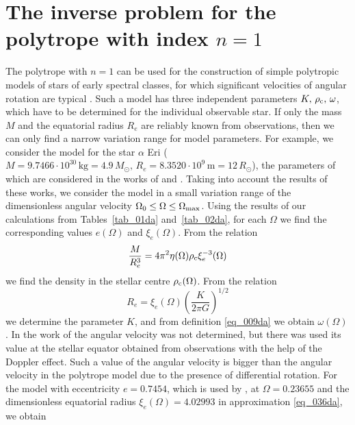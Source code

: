\documentclass{caosp308}
\begin{document}

\section{The inverse problem for the polytrope with index $n=1$}
\label{sect_07da}

The polytrope with $n=1$ can be used for the construction of simple polytropic models of stars of early spectral classes, for which significant velocities of angular rotation are typical \citep{2015MNRAS.448..456K}. Such a model has three independent parameters $K,\,\rho_{\rm c},\,\omega$, which have to be determined for the individual observable star. If only the mass $M$ and the equatorial radius $R_e$ are reliably known from observations, then we can only find a narrow variation range for model parameters. For example, we consider the model for the star $\alpha$ Eri ($M=9.7466\cdot10^{30}\,\text{kg}=4.9\,M_\odot,\,R_e=8.3520\cdot10^9\,\text{m}=12\,R_\odot$), the parameters of which are considered in the works of \citet{2015MNRAS.448..456K} and \citet{2017MNRAS.467.4965K}. Taking into account the results of these works, we consider the model in a small variation range of the dimensionless angular velocity $\Omega_0\leq\Omega\leq\Omega_{\rm max}$. Using the results of our calculations from Tables~\ref{tab_01da} and~\ref{tab_02da}, for each $\Omega$ we find the corresponding values $e(\Omega)$ and $\xi_e(\Omega)$. From the relation
\begin{equation}
\label{eq_058da}
\frac{M}{R_e^3}=4\pi^2\eta(\Omega)\rho_{\rm c}\xi_e^{-3}(\Omega)
\end{equation}
we find the density in the stellar centre $\rho_{\rm c}(\Omega)$. From the relation
\begin{equation}
\label{eq_059da}
R_e=\xi_e(\Omega)\left(\frac{K}{2\pi G}\right)^{1/2}
\end{equation}
we determine the parameter $K$, and from definition \eqref{eq_009da} we obtain $\omega(\Omega)$. In the work of \citet{2015MNRAS.448..456K} the angular velocity was not determined, but there was used its value at the stellar equator obtained from observations with the help of the Doppler effect. Such a value of the angular velocity is bigger than the angular velocity in the polytrope model due to the presence of differential rotation.    
For the model with eccentricity $e=0.7454$, which is used by \citet{2015MNRAS.448..456K}, at $\Omega=0.23655$ and the dimensionless equatorial radius $\xi_e(\Omega)=4.02993$ in approximation \eqref{eq_036da}, we obtain 
\end{document}
